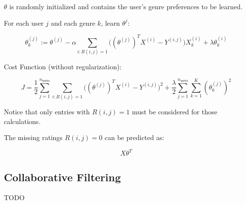 \documentclass[a4paper,11pt]{scrartcl}
\begin{document}
$\theta$ is randomly initialized and contains the user's genre preferences to be learned.

For each user $j$ and each genre $k$, learn $\theta^{j}$:

$$ \theta^{(j)}_{k} := \theta^{(j)} - \alpha \sum_{i:R(i,j)=1} \Big( (\theta^{(j)})^{T}X^{(i)} - Y^{(i,j)} \Big) X_{k}^{(i)} + \lambda \theta_{k}^{(i)}$$

Cost Function (without regularization):

$$ J = \frac{1}{2} \sum_{j=1}^{n_{\text{users}}} \sum_{i:R(i,j)=1} \Big( (\theta^{(j)})^{T}X^{(i)} - Y^{(i,j)} \Big)^2 + \frac{\lambda}{2} \sum_{j=1}^{n_{\text{users}}} \sum_{k=1}^{K} (\theta_k^{(j)})^2 $$

Notice that only entries with $R(i,j)=1$ must be considered for those calculations.

The missing ratings $R(i,j)=0$ can be predicted as:

$$ X \theta^T $$

\subsection{Collaborative Filtering}

TODO
\end{document}
